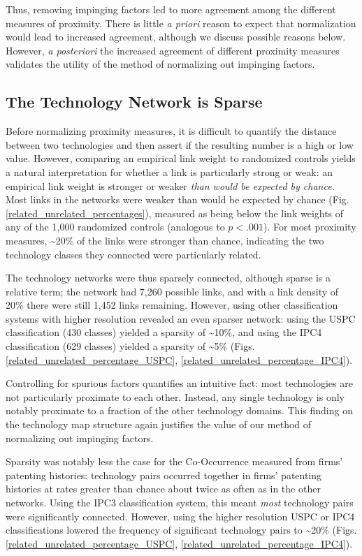 \documentclass[]{svjour3}
\begin{document}
Thus, removing impinging factors led to more agreement among the different measures of proximity. There is little \textit{a priori} reason to expect that normalization would lead to increased agreement, although we discuss possible reasons below. However, \textit{a posteriori} the increased agreement of different proximity measures validates the utility of the method of normalizing out impinging factors.

\subsection{The Technology Network is Sparse}
Before normalizing proximity measures, it is difficult to quantify the distance between two technologies and then assert if the resulting number is a high or low value. However, comparing an empirical link weight to randomized controls yields a natural interpretation for whether a link is particularly strong or weak: an empirical link weight is stronger or weaker \textit{than would be expected by chance.} Most links in the networks were weaker than would be expected by chance (Fig. \ref{related_unrelated_percentages}), measured as being below the link weights of any of the 1,000 randomized controls (analogous to $p<.001$). For most proximity measures, \textasciitilde{}20\% of the links were stronger than chance, indicating the two technology classes they connected were particularly related. 

The technology networks were thus sparsely connected, although sparse is a relative term; the network had 7,260 possible links, and with a link density of 20\% there were still 1,452 links remaining. However, using other classification systems with higher resolution revealed an even sparser network: using the USPC classification (430 classes) yielded a sparsity of \textasciitilde{}10\%, and using the IPC4 classification (629 classes) yielded a sparsity of \textasciitilde{}5\% (Figs. \ref{related_unrelated_percentage_USPC}, \ref{related_unrelated_percentage_IPC4}).

Controlling for spurious factors quantifies an intuitive fact: most technologies are not particularly proximate to each other. Instead, any single technology is only notably proximate to a fraction of the other technology domains. This finding on the technology map structure again justifies the value of our method of normalizing out impinging factors.

Sparsity was notably less the case for the Co-Occurrence measured from firms' patenting histories: technology pairs occurred together in firms' patenting histories at rates greater than chance about twice as often as in the other networks. Using the IPC3 classification system, this meant \textit{most} technology pairs were significantly connected. However, using the higher resolution USPC or IPC4 classifications lowered the frequency of significant technology pairs to \textasciitilde{}20\% (Figs. \ref{related_unrelated_percentage_USPC}, \ref{related_unrelated_percentage_IPC4}).
\end{document}

